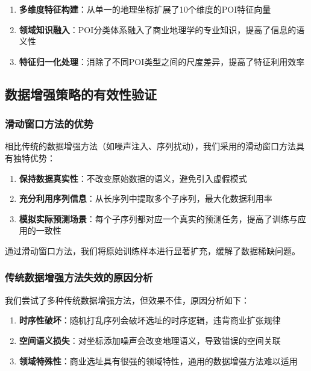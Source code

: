 \documentclass{article}
\begin{document}
\begin{enumerate}
\item \textbf{多维度特征构建}：从单一的地理坐标扩展了10个维度的POI特征向量
\item \textbf{领域知识融入}：POI分类体系融入了商业地理学的专业知识，提高了信息的语义性
\item \textbf{特征归一化处理}：消除了不同POI类型之间的尺度差异，提高了特征利用效率
\end{enumerate}

\subsection{数据增强策略的有效性验证}

\subsubsection{滑动窗口方法的优势}

相比传统的数据增强方法（如噪声注入、序列扰动），我们采用的滑动窗口方法具有独特优势：

\begin{enumerate}
\item \textbf{保持数据真实性}：不改变原始数据的语义，避免引入虚假模式
\item \textbf{充分利用序列信息}：从长序列中提取多个子序列，最大化数据利用率
\item \textbf{模拟实际预测场景}：每个子序列都对应一个真实的预测任务，提高了训练与应用的一致性
\end{enumerate}

通过滑动窗口方法，我们将原始训练样本进行显著扩充，缓解了数据稀缺问题。

\subsubsection{传统数据增强方法失效的原因分析}

我们尝试了多种传统数据增强方法，但效果不佳，原因分析如下：

\begin{enumerate}
\item \textbf{时序性破坏}：随机打乱序列会破坏选址的时序逻辑，违背商业扩张规律
\item \textbf{空间语义损失}：对坐标添加噪声会改变地理语义，导致错误的空间关联
\item \textbf{领域特殊性}：商业选址具有很强的领域特性，通用的数据增强方法难以适用
\end{enumerate}
\end{document}
